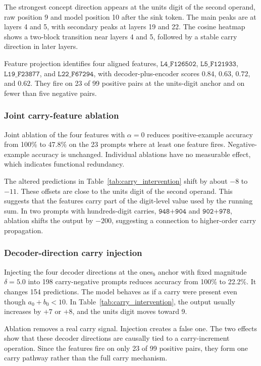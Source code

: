 The strongest concept direction appears at the units digit of the second operand,
raw position 9 and model position 10 after the sink token. The main peaks are at
layers 4 and 5, with secondary peaks at layers 19 and 22. The cosine heatmap shows
a two-block transition near layers 4 and 5, followed by a stable carry direction in
later layers.

Feature projection identifies four aligned features,
\(\texttt{L4\_F126502}\), \(\texttt{L5\_F121933}\),
\(\texttt{L19\_F23877}\), and \(\texttt{L22\_F67294}\), with decoder-plus-encoder
scores \(0.84\), \(0.63\), \(0.72\), and \(0.62\). They fire on 23 of 99 positive
pairs at the units-digit anchor and on fewer than five negative pairs.

\subsubsection*{Joint carry-feature ablation}

Joint ablation of the four features with \(\alpha=0\) reduces positive-example
accuracy from 100\% to 47.8\% on the 23 prompts where at least one feature fires.
Negative-example accuracy is unchanged. Individual ablations have no measurable
effect, which indicates functional redundancy.

The altered predictions in Table~\ref{tab:carry_intervention} shift by about
\(-8\) to \(-11\). These offsets are close to the units digit of the second
operand. This suggests that the features carry part of the digit-level value used
by the running sum. In two prompts with hundreds-digit carries, \(\texttt{948+904}\)
and \(\texttt{902+978}\), ablation shifts the output by \(-200\), suggesting a
connection to higher-order carry propagation.

\subsubsection*{Decoder-direction carry injection}

Injecting the four decoder directions at the ones$_b$ anchor with fixed magnitude
\(\delta=5.0\) into 198 carry-negative prompts reduces accuracy from 100\% to
22.2\%. It changes 154 predictions. The model behaves as if a carry were present
even though \(a_0+b_0<10\). In Table~\ref{tab:carry_intervention}, the output
usually increases by \(+7\) or \(+8\), and the units digit moves toward 9.

Ablation removes a real carry signal. Injection creates a false one. The two
effects show that these decoder directions are causally tied to a carry-increment
operation. Since the features fire on only 23 of 99 positive pairs, they form one
carry pathway rather than the full carry mechanism.

